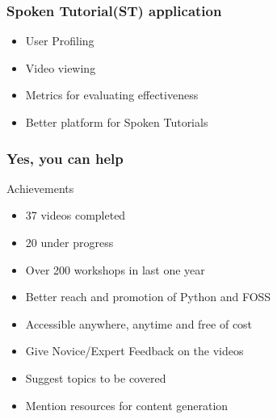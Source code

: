 \documentclass[compress,red]{beamer} %
\begin{document}
\begin{frame}
\frametitle{Spoken Tutorial(ST) application}
\begin{itemize}
\item User Profiling
\item Video viewing
\item Metrics for evaluating effectiveness
\item Better platform for Spoken Tutorials
\end{itemize}
\end{frame}

\begin{frame}
\frametitle{Yes, you can help}
\begin{block}{Achievements}
\begin{itemize}
\item 37 videos completed
\item 20 under progress
\item Over 200 workshops in last one year
\item Better reach and promotion of Python and FOSS
\item Accessible anywhere, anytime and free of cost
\end{itemize}
\end{block}
\begin{itemize}
\item Give Novice/Expert Feedback on the videos
\item Suggest topics to be covered
\item Mention resources for content generation
\end{itemize}
\end{frame}
\end{document}
